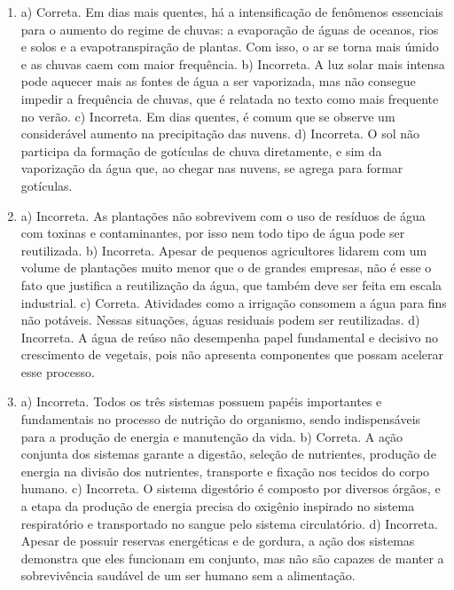 

\begin{enumerate}

\item
a) Correta. Em dias mais quentes, há a intensificação de fenômenos
essenciais para o aumento do regime de chuvas: a evaporação de águas de
oceanos, rios e solos e a evapotranspiração de plantas. Com isso, o ar
se torna mais úmido e as chuvas caem com maior frequência.
b) Incorreta. A luz solar mais intensa pode aquecer mais as fontes de
água a ser vaporizada, mas não consegue impedir a frequência de chuvas,
que é relatada no texto como mais frequente no verão.
c) Incorreta. Em dias quentes, é comum que se observe um considerável
aumento na precipitação das nuvens.
d) Incorreta. O sol não participa da formação de gotículas de chuva
diretamente, e sim da vaporização da água que, ao chegar nas nuvens, se
agrega para formar gotículas.

\item
a) Incorreta. As plantações não sobrevivem com o uso de resíduos de água
com toxinas e contaminantes, por isso nem todo tipo de água pode ser
reutilizada.
b) Incorreta. Apesar de pequenos agricultores lidarem com um volume de
plantações muito menor que o de grandes empresas, não é esse o fato que
justifica a reutilização da água, que também deve ser feita em escala
industrial.
c) Correta. Atividades como a irrigação consomem a água para fins
não potáveis. Nessas situações, águas residuais podem ser reutilizadas.
d) Incorreta. A água de reúso não desempenha papel fundamental e
decisivo no crescimento de vegetais, pois não apresenta componentes que
possam acelerar esse processo.

\item
a) Incorreta. Todos os três sistemas possuem papéis importantes e
fundamentais no processo de nutrição do organismo, sendo indispensáveis
para a produção de energia e manutenção da vida.
b) Correta. A ação conjunta dos sistemas garante a digestão, seleção de
nutrientes, produção de energia na divisão dos nutrientes, transporte e
fixação nos tecidos do corpo humano.
c) Incorreta. O sistema digestório é composto por diversos órgãos, e a
etapa da produção de energia precisa do oxigênio inspirado no sistema
respiratório e transportado no sangue pelo sistema circulatório.
d) Incorreta. Apesar de possuir reservas energéticas e de gordura, a
ação dos sistemas demonstra que eles funcionam em conjunto, mas não são
capazes de manter a sobrevivência saudável de um ser humano sem a
alimentação.
\end{enumerate}
